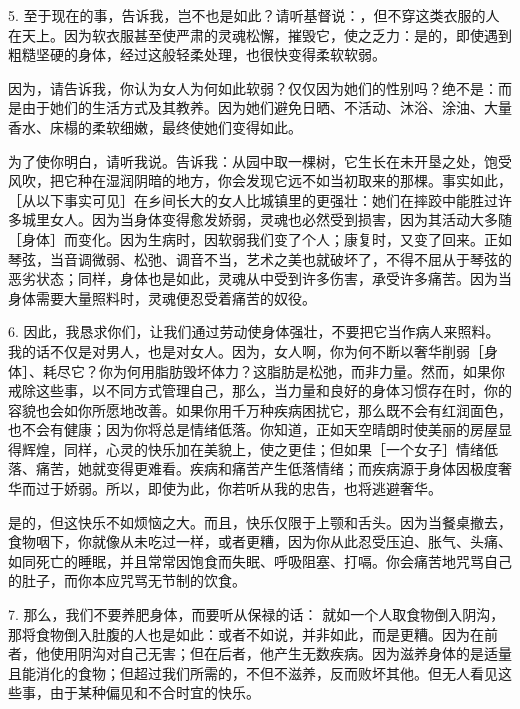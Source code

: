 5. 至于现在的事，告诉我，岂不也是如此？请听基督说：，但不穿这类衣服的人在天上。因为软衣服甚至使严肃的灵魂松懈，摧毁它，使之乏力：是的，即使遇到粗糙坚硬的身体，经过这般轻柔处理，也很快变得柔软软弱。\par

因为，请告诉我，你认为女人为何如此软弱？仅仅因为她们的性别吗？绝不是：而是由于她们的生活方式及其教养。因为她们避免日晒、不活动、沐浴、涂油、大量香水、床榻的柔软细嫩，最终使她们变得如此。\par

为了使你明白，请听我说。告诉我：从园中取一棵树，它生长在未开垦之处，饱受风吹，把它种在湿润阴暗的地方，你会发现它远不如当初取来的那棵。事实如此，［从以下事实可见］在乡间长大的女人比城镇里的更强壮：她们在摔跤中能胜过许多城里女人。因为当身体变得愈发娇弱，灵魂也必然受到损害，因为其活动大多随［身体］而变化。因为生病时，因软弱我们变了个人；康复时，又变了回来。正如琴弦，当音调微弱、松弛、调音不当，艺术之美也就破坏了，不得不屈从于琴弦的恶劣状态；同样，身体也是如此，灵魂从中受到许多伤害，承受许多痛苦。因为当身体需要大量照料时，灵魂便忍受着痛苦的奴役。\par

6. 因此，我恳求你们，让我们通过劳动使身体强壮，不要把它当作病人来照料。我的话不仅是对男人，也是对女人。因为，女人啊，你为何不断以奢华削弱［身体］、耗尽它？你为何用脂肪毁坏体力？这脂肪是松弛，而非力量。然而，如果你戒除这些事，以不同方式管理自己，那么，当力量和良好的身体习惯存在时，你的容貌也会如你所愿地改善。如果你用千万种疾病困扰它，那么既不会有红润面色，也不会有健康；因为你将总是情绪低落。你知道，正如天空晴朗时使美丽的房屋显得辉煌，同样，心灵的快乐加在美貌上，使之更佳；但如果［一个女子］情绪低落、痛苦，她就变得更难看。疾病和痛苦产生低落情绪；而疾病源于身体因极度奢华而过于娇弱。所以，即使为此，你若听从我的忠告，也将逃避奢华。\par

 是的，但这快乐不如烦恼之大。而且，快乐仅限于上颚和舌头。因为当餐桌撤去，食物咽下，你就像从未吃过一样，或者更糟，因为你从此忍受压迫、胀气、头痛、如同死亡的睡眠，并且常常因饱食而失眠、呼吸阻塞、打嗝。你会痛苦地咒骂自己的肚子，而你本应咒骂无节制的饮食。\par

7. 那么，我们不要养肥身体，而要听从保禄的话： 就如一个人取食物倒入阴沟，那将食物倒入肚腹的人也是如此：或者不如说，并非如此，而是更糟。因为在前者，他使用阴沟对自己无害；但在后者，他产生无数疾病。因为滋养身体的是适量且能消化的食物；但超过我们所需的，不但不滋养，反而败坏其他。但无人看见这些事，由于某种偏见和不合时宜的快乐。\par

